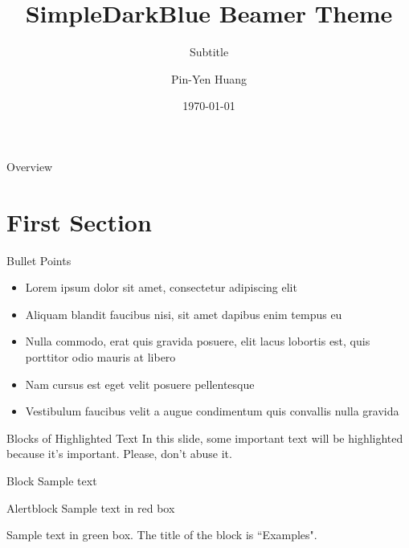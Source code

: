 \documentclass[aspectratio=169,xcolor=dvipsnames]{beamer}
\title{SimpleDarkBlue Beamer Theme}
\subtitle{Subtitle}
\author{Pin-Yen Huang}
\institute
{
    Department of Computer Science and Information Engineering \\
    National Taiwan University %
}
\date{\today} %
\begin{document}
\begin{frame}
    \titlepage
\end{frame}

\begin{frame}{Overview}
    \tableofcontents
\end{frame}

\section{First Section}


\begin{frame}{Bullet Points}
    \begin{itemize}
        \item Lorem ipsum dolor sit amet, consectetur adipiscing elit
        \item Aliquam blandit faucibus nisi, sit amet dapibus enim tempus eu
        \item Nulla commodo, erat quis gravida posuere, elit lacus lobortis est, quis porttitor odio mauris at libero
        \item Nam cursus est eget velit posuere pellentesque
        \item Vestibulum faucibus velit a augue condimentum quis convallis nulla gravida
    \end{itemize}
\end{frame}


\begin{frame}{Blocks of Highlighted Text}
    In this slide, some important text will be \alert{highlighted} because it's important. Please, don't abuse it.

    \begin{block}{Block}
        Sample text
    \end{block}

    \begin{alertblock}{Alertblock}
        Sample text in red box
    \end{alertblock}

    \begin{examples}
        Sample text in green box. The title of the block is ``Examples".
    \end{examples}
\end{frame}
\end{document}
